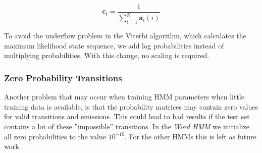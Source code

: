 \begin{equation}\label{eq:rabiner-scaling}
\textbf{c}_t = \frac{1}{ \displaystyle\sum_{i=1}^N \textbf{a}_t(i)}
\end{equation}

To avoid the underflow problem in the Viterbi algorithm, which calculates the maximum likelihood state sequence, we add log probabilities instead of multiplying probabilities.
With this change, no scaling is required.

\subsubsection{Zero Probability Transitions}
Another problem that may occur when training HMM parameters when little training data is available, is that the probability matrices may contain zero values for valid transitions and emissions.
This could lead to bad results if the test set contains a lot of these ''impossible'' transitions.
In the \textit{Word HMM} we initialize all zero probabilities to the value \textbf{ $10^{-10}$}.
For the other HMMs this is left as future work.